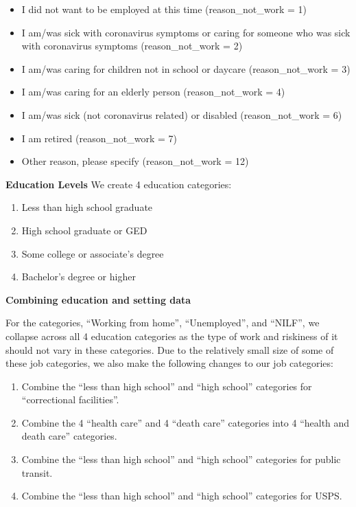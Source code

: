 \documentclass[
]{article}
\providecommand{\tightlist}{%
  \setlength{\itemsep}{0pt}\setlength{\parskip}{0pt}}
\begin{document}
\begin{itemize}
\begin{itemize}
    \begin{itemize}
    \tightlist
    \item
      I did not want to be employed at this time (reason\_not\_work = 1)
    \item
      I am/was sick with coronavirus symptoms or caring for someone who
      was sick with coronavirus symptoms (reason\_not\_work = 2)
    \item
      I am/was caring for children not in school or daycare
      (reason\_not\_work = 3)
    \item
      I am/was caring for an elderly person (reason\_not\_work = 4)
    \item
      I am/was sick (not coronavirus related) or disabled
      (reason\_not\_work = 6)
    \item
      I am retired (reason\_not\_work = 7)
    \item
      Other reason, please specify (reason\_not\_work = 12)
    \end{itemize}
  \end{itemize}
\end{itemize}

\textbf{Education Levels} We create 4 education categories:

\begin{enumerate}
\def\labelenumi{\arabic{enumi}.}
\tightlist
\item
  Less than high school graduate
\item
  High school graduate or GED
\item
  Some college or associate's degree
\item
  Bachelor's degree or higher
\end{enumerate}

\textbf{Combining education and setting data}

For the categories, ``Working from home'', ``Unemployed'', and ``NILF'',
we collapse across all 4 education categories as the type of work and
riskiness of it should not vary in these categories. Due to the
relatively small size of some of these job categories, we also make the
following changes to our job categories:

\begin{enumerate}
\def\labelenumi{\arabic{enumi}.}
\tightlist
\item
  Combine the ``less than high school'' and ``high school'' categories
  for ``correctional facilities''.
\item
  Combine the 4 ``health care'' and 4 ``death care'' categories into 4
  ``health and death care'' categories.
\item
  Combine the ``less than high school'' and ``high school'' categories
  for public transit.
\item
  Combine the ``less than high school'' and ``high school'' categories
  for USPS.
\end{enumerate}
\end{document}
